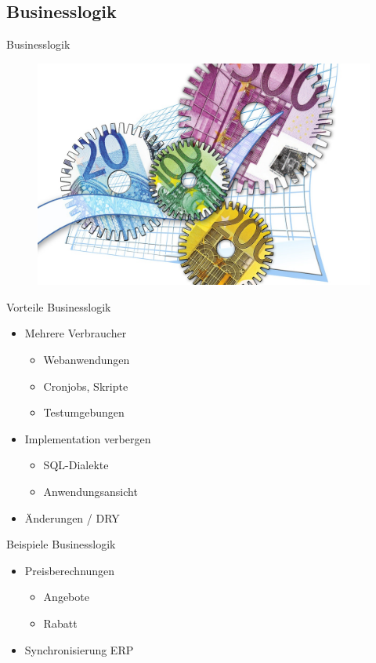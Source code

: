 \subsection{Businesslogik}
\begin{frame}{Businesslogik}
\begin{figure}[!ht]
\centering
\includegraphics[width=0.75\linewidth]{img/business-logic.jpg}
\end{figure}
\end{frame}

\begin{frame}{Vorteile Businesslogik}
\begin{itemize}
\item Mehrere Verbraucher
\begin{itemize}
\item Webanwendungen
\item Cronjobs, Skripte
\item Testumgebungen
\end{itemize}
\item Implementation verbergen
\begin{itemize}
\item SQL-Dialekte
\item Anwendungsansicht
\end{itemize}
\item Änderungen / DRY
\end{itemize}
\end{frame}

\begin{frame}{Beispiele Businesslogik}
\begin{itemize}
\item Preisberechnungen
\begin{itemize}
\item Angebote
\item Rabatt
\end{itemize}
\item Synchronisierung ERP
\end{itemize}
\end{frame}

